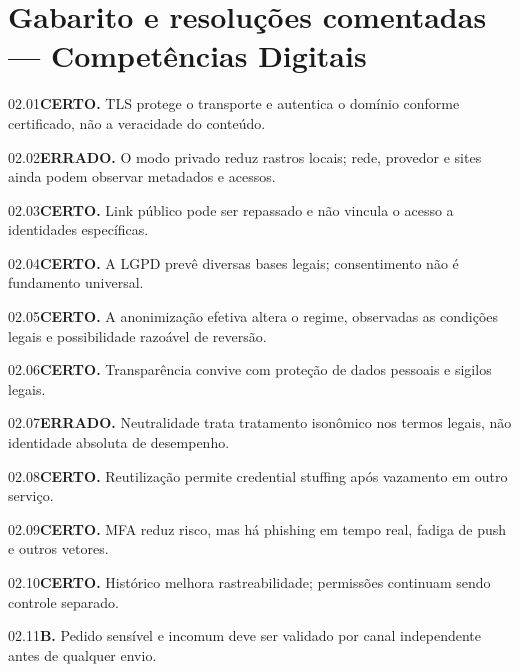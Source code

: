 \section{Gabarito e resoluções comentadas — Competências Digitais}

\begin{solucao}{02.01}\textbf{CERTO.} TLS protege o transporte e autentica o domínio conforme certificado, não a veracidade do conteúdo.\end{solucao}
\begin{solucao}{02.02}\textbf{ERRADO.} O modo privado reduz rastros locais; rede, provedor e sites ainda podem observar metadados e acessos.\end{solucao}
\begin{solucao}{02.03}\textbf{CERTO.} Link público pode ser repassado e não vincula o acesso a identidades específicas.\end{solucao}
\begin{solucao}{02.04}\textbf{CERTO.} A LGPD prevê diversas bases legais; consentimento não é fundamento universal.\end{solucao}
\begin{solucao}{02.05}\textbf{CERTO.} A anonimização efetiva altera o regime, observadas as condições legais e possibilidade razoável de reversão.\end{solucao}
\begin{solucao}{02.06}\textbf{CERTO.} Transparência convive com proteção de dados pessoais e sigilos legais.\end{solucao}
\begin{solucao}{02.07}\textbf{ERRADO.} Neutralidade trata tratamento isonômico nos termos legais, não identidade absoluta de desempenho.\end{solucao}
\begin{solucao}{02.08}\textbf{CERTO.} Reutilização permite credential stuffing após vazamento em outro serviço.\end{solucao}
\begin{solucao}{02.09}\textbf{CERTO.} MFA reduz risco, mas há phishing em tempo real, fadiga de push e outros vetores.\end{solucao}
\begin{solucao}{02.10}\textbf{CERTO.} Histórico melhora rastreabilidade; permissões continuam sendo controle separado.\end{solucao}
\begin{solucao}{02.11}\textbf{B.} Pedido sensível e incomum deve ser validado por canal independente antes de qualquer envio.\end{solucao}
